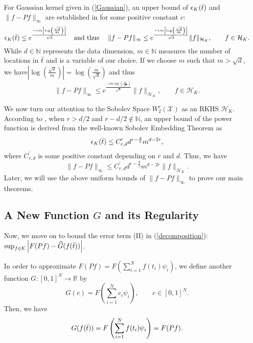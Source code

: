 \documentclass{article}
\def\NN{\mathbb N}
\def\RR{\mathbb R}
\numberwithin{equation}{section}
\begin{document}
For Gaussian kernel given in (\ref{Gaussian}), an upper bound of $\epsilon_K(\Bar{t})$ and $\|f-Pf\|_\infty$ are established in  \citep[Equation (14)]{fasshauer2005meshfree} for some positive constant $c$: 
\begin{equation}
\epsilon_K(\Bar{t}) \leq e^{\frac{-cm\left|\log \left(\frac{\sqrt{d}}{m}\right)\right|}{\sqrt{d}}} \quad \text{and thus }\quad
    \|f-Pf\|_\infty \leq e^{\frac{-cm\left|\log \left(\frac{\sqrt{d}}{m}\right)\right|}{\sqrt{d}}}\|f\|_{\mathcal{H}_K}, \qquad f\in  \mathcal{H}_K.
\end{equation}
While $d\in \NN$ represents the data dimension, $m\in \NN$ measures the number of locations in $\Bar{t}$ and is a variable of our choice. If we choose $m$ such that $m>\sqrt{d}$, we have$\left|\log \left(\frac{\sqrt{d}}{m}\right)\right| = \log \left(\frac{m}{\sqrt{d}}\right)$ and thus
\begin{equation}\label{f-Pf_Gaussian}
    \|f-Pf\|_\infty \leq e^{\frac{-cm\log \left(\frac{m}{\sqrt{d}}\right)}{\sqrt{d}}}\|f\|_{\mathcal{H}_K}, \qquad f\in  \mathcal{H}_K.
\end{equation}

We now turn our attention to the Sobolev Space $W^r_2(\mathcal{X})$ as an RKHS $\mathcal{H}_K$. According to \citep[Theorem 6.5.3]{schaback1997reconstruction}, when $r>d/2$ and $r-d/2 \notin \NN$, an upper bound of the power function is derived from the well-known Sobolev Embedding Theorem as 
\begin{equation*}
\epsilon_K(\Bar{t})  \leq C^\prime_{r,d}d^{r-\frac{d}{2}}m^{d-2r},
\end{equation*}
where $C^\prime_{r,d}$ is some positive constant depending on $r$ and $d$. Thus, we have 
\begin{equation}\label{f-Pf_Sobolev}
\|f-Pf\|_\infty  \leq C^\prime_{r,d}d^{r-\frac{d}{2}}m^{d-2r}\|f\|_{\mathcal{H}_K}.
\end{equation} 
Later, we will use the above uniform bounds of $\|f-Pf\|_\infty$ to prove our main theorems. 
   
\subsection{A New Function $G$ and its Regularity}   

Now, we move on to bound the error term (II) in (\ref{decomposition}): $\sup_{f\in \mathcal{K}}\left|F(Pf) - \widehat{G}(f(\Bar{t}))\right|$.

In order to approximate  $F(Pf) = F\left(\sum_{i=1}^N f(t_i) \psi_i\right)$, we define another function $G:[0,1]^N \rightarrow \RR$ by 
\begin{equation}\label{G}
    G(c) = F\left(\sum_{i=1}^N c_i \psi_i\right), \qquad  c\in [0,1]^N. 
\end{equation}
Then, we have $$G(f(\Bar{t})) = F\left(\sum_{i=1}^N f(t_i) \psi_i\right) = F(Pf).$$ 
\end{document}
